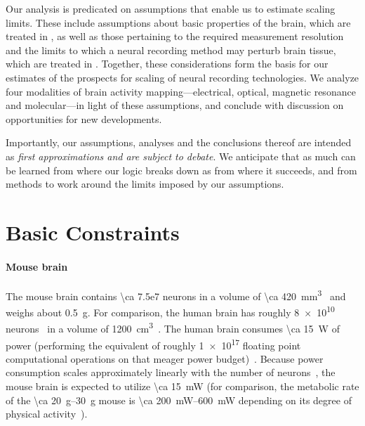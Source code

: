 \begin{figure}[htbp]
\hspace{0.5in}
\end{figure}

Our analysis is predicated on assumptions that enable us to estimate scaling limits.
These include assumptions about basic properties of the brain, which are treated in , as well as those pertaining to the required measurement resolution and the limits to which a neural recording method may perturb brain tissue, which are treated in .
Together, these considerations form the basis for our estimates of the prospects for scaling of neural recording technologies.
We analyze four modalities of brain activity mapping---electrical, optical, magnetic resonance and molecular---in light of these assumptions, and conclude with discussion on opportunities for new developments.

Importantly, our assumptions, analyses and the conclusions thereof are intended as \emph{first approximations and are subject to debate}.
We anticipate that as much can be learned from where our logic breaks down as from where it succeeds, and from methods to work around the limits imposed by our assumptions.

\section{Basic Constraints}
\label{sec:constraints}

\paragraph{Mouse brain}
The mouse brain contains \num{\ca 7.5e7} neurons in a volume of \SI{\ca 420}{\milli\meter\cubed}~\cite{vincent10} and weighs about \SI{0.5}{\gram}.
For comparison, the human brain has roughly \num{8e10} neurons~\cite{azevedo09} in a volume of \SI{1200}{\centi\meter\cubed}~\cite{allen02}.
The human brain consumes \SI{\ca 15}{\watt} of power (performing the equivalent of roughly \num{1e17} floating point computational operations on that meager power budget)~\cite{sarpeshkar10}.
Because power consumption scales approximately linearly with the number of neurons~\cite{houzel11}, the mouse brain is expected to utilize \SI{\ca 15}{\milli\watt} (for comparison, the metabolic rate of the \SIrange{\ca 20}{30}{\gram} mouse is \SIrange{\ca 200}{600}{\milli\watt} depending on its degree of physical activity~\cite{speakman13}).

